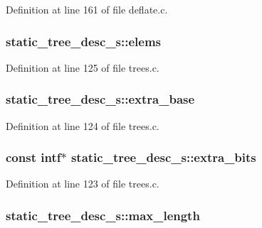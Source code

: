 Definition at line 161 of file deflate.\-c.

\hypertarget{structstatic__tree__desc__s_ab4bad1c091188c43413a09f626a5787f}{
\subsubsection[{elems}]{ static\-\_\-tree\-\_\-desc\-\_\-s\-::elems}}\label{structstatic__tree__desc__s_ab4bad1c091188c43413a09f626a5787f}


Definition at line 125 of file trees.\-c.

\hypertarget{structstatic__tree__desc__s_a1051cc83d9d410ccf21427df9bd85201}{
\subsubsection[{extra\-\_\-base}]{ static\-\_\-tree\-\_\-desc\-\_\-s\-::extra\-\_\-base}}\label{structstatic__tree__desc__s_a1051cc83d9d410ccf21427df9bd85201}


Definition at line 124 of file trees.\-c.

\hypertarget{structstatic__tree__desc__s_a4ec9abd624cbf2bfcc48dfb786925986}{
\subsubsection[{extra\-\_\-bits}]{\setlength{\rightskip}{0pt plus 5cm}const {\bf intf}$\ast$ static\-\_\-tree\-\_\-desc\-\_\-s\-::extra\-\_\-bits}}\label{structstatic__tree__desc__s_a4ec9abd624cbf2bfcc48dfb786925986}


Definition at line 123 of file trees.\-c.

\hypertarget{structstatic__tree__desc__s_ae767848725194f63fa9cf08142767ad4}{
\subsubsection[{max\-\_\-length}]{ static\-\_\-tree\-\_\-desc\-\_\-s\-::max\-\_\-length}}\label{structstatic__tree__desc__s_ae767848725194f63fa9cf08142767ad4}


